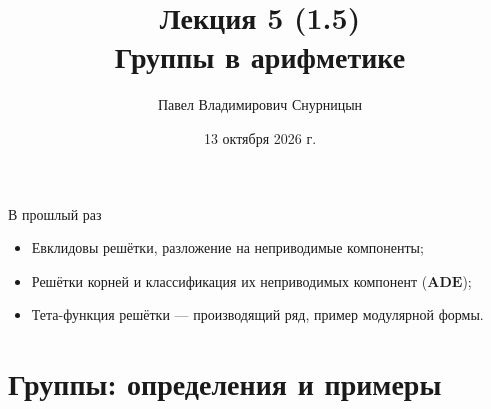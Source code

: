 \documentclass[serif, aspectratio=169]{beamer}
\author{Павел Владимирович Снурницын}
\title{Лекция 5 (1.5)\\ Группы в арифметике}
\institute{к.ф.-м.н., с.н.с., ИБ ВМК}
\date{\small 13 октября 2026 г.}
\begin{document}
\begin{frame}
    \titlepage
\end{frame}
\note{}

\begin{frame}{В прошлый раз}
    \begin{itemize}
        \item Евклидовы решётки, разложение на неприводимые компоненты;
        \item Решётки корней и классификация их неприводимых компонент ($\mathbf{ADE}$);
        \item Тета-функция решётки --- производящий ряд, пример модулярной формы.
    \end{itemize}
    \note{
        \begin{itemize}
            \item ---
        \end{itemize}
    }
\end{frame}

\section{Группы: определения и примеры}
\end{document}
